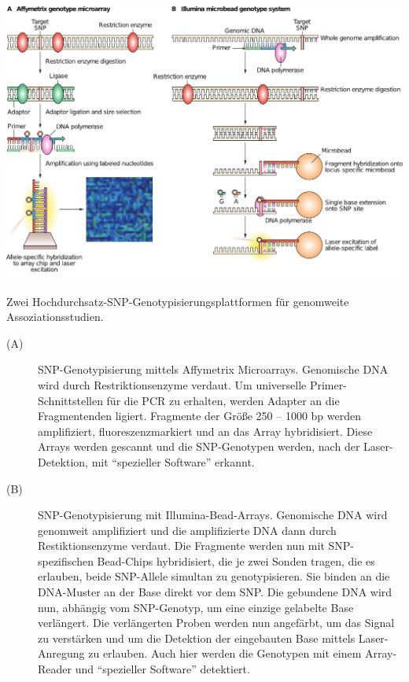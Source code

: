 \includegraphics[width=1\textwidth]{lectures/V2/pix/snp_arrays.pdf}

Zwei Hochdurchsatz-SNP-Genotypisierungsplattformen für genomweite Assoziationsstudien.

\begin{description}
    \item[(A)] SNP-Genotypisierung mittels Affymetrix Microarrays. Genomische DNA wird durch Restriktionsenzyme verdaut. 
        Um universelle Primer-Schnittstellen für die PCR zu erhalten, werden Adapter an die Fragmentenden ligiert. 
        Fragmente der Größe 250 – 1000 bp werden amplifiziert, fluoreszenzmarkiert und an das Array hybridisiert. 
        Diese Arrays werden gescannt und die SNP-Genotypen werden, nach der Laser-Detektion, mit ``spezieller Software'' erkannt.
    \item[(B)] SNP-Genotypisierung mit Illumina-Bead-Arrays. Genomische DNA wird genomweit amplifiziert und die amplifizierte DNA dann durch Restiktionsenzyme verdaut. 
        Die Fragmente werden nun mit SNP-spezifischen Bead-Chips hybridisiert, die je zwei Sonden tragen, die es erlauben, beide SNP-Allele simultan zu genotypisieren. 
        Sie binden an die DNA-Muster an der Base direkt vor dem SNP.
        Die gebundene DNA wird nun, abhängig vom SNP-Genotyp, um eine einzige gelabelte Base verlängert.
        Die verlängerten Proben werden nun angefärbt, um das Signal zu verstärken und um die Detektion der eingebauten Base mittels Laser-Anregung zu erlauben. 
        Auch hier werden die Genotypen mit einem Array-Reader und ``spezieller Software'' detektiert.
\end{description}

\newpage
